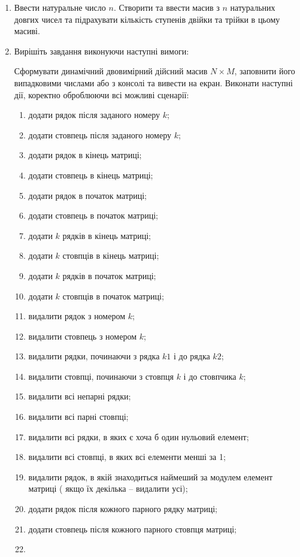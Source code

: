 \documentclass[]{article}
\makeatletter
\newcommand{\xslalph}[1]{\expandafter\@xslalph\csname c@#1\endcsname}
\newcommand{\@xslalph}[1]{%
    \ifcase#1\or а\or б\or в\or г\or д\or e\or є\or ж\or з\or i%
    \or й\or к\or л\or м\or н\or о\or п\or р\or с\or т%
    \or у\or ф\or х\or ц\or ч\or ш\or ю\or я\or аа\or бб\or вв %
    \else\@ctrerr\fi%
}
\makeatother
\begin{document}
\begin{enumerate}
\item
  Ввести натуральне число $n$. Створити та ввести масив з $n$ натуральних
 довгих чисел та підрахувати кількість ступенів двійки та трійки в цьому масиві.
\item
  Вирішіть завдання виконуючи наступні вимоги:

Сформувати динамічний двовимірний дійсний масив $N \times M$, заповнити його випадковими
числами або з консолі та вивести на екран. Виконати наступні дії, коректно оброблюючи 
всі можливі сценарії:

\begin{enumerate}[label=\xslalph*)]
\item
  додати рядок після заданого номеру $k$;
\item
  додати стовпець після заданого номеру $k$;
\item
  додати рядок в кінець матриці;
\item
  додати стовпець в кінець матриці;
\item
  додати рядок в початок матриці;
\item
  додати стовпець в початок матриці;
\item
  додати $k$ рядків в кінець матриці;
\item
  додати $k$ стовпців в кінець матриці;
\item
  додати $k$ рядків в початок матриці;
\item
  додати $k$ стовпців в початок матриці;
\item
  видалити рядок з номером $k$;
\item
  видалити стовпець з номером $k$;
\item
  видалити рядки, починаючи з рядка $k1$ і до рядка $k2$;
\item
  видалити стовпці, починаючи з стовпця $k$ і до стовпчика $k$;
\item
  видалити всі непарні рядки;
\item
  видалити всі парні стовпці;
\item
  видалити всі рядки, в яких є хоча б один нульовий елемент;
\item
  видалити всі стовпці, в яких всі елементи менші за 1;
\item
  видалити рядок, в якій знаходиться наймеший за модулем елемент матриці (
якщо їх декілька -- видалити усі);
\item
  додати рядок після кожного парного рядку матриці;
\item
  додати стовпець після кожного парного стовпця матриці;
\item

\end{enumerate}
\end{enumerate}
\end{document}
